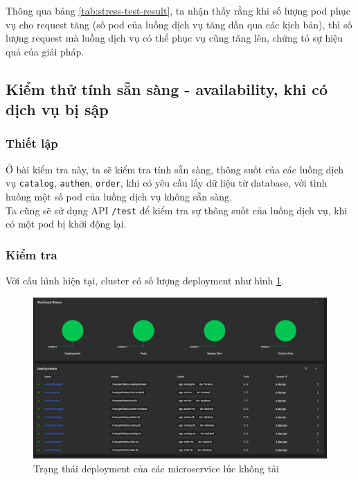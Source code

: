 Thông qua bảng \ref{tab:stress-test-result}, ta nhận thấy rằng khi số lượng pod phục vụ cho request tăng (số pod của luồng dịch vụ tăng dần qua các kịch bản), thì số lượng request mà luồng dịch vụ có thể phục vụ cũng tăng lên, chứng tỏ sự hiệu quả của giải pháp.

\subsection{Kiểm thử tính sẵn sàng - availability, khi có dịch vụ bị sập}
\subsubsection{Thiết lập}
\noindent Ở bài kiểm tra này, ta sẽ kiểm tra tính sẵn sàng, thông suốt của các luồng dịch vụ \lstinline|catalog|, \lstinline|authen|, \lstinline|order|, khi có yêu cầu lấy dữ liệu từ database, với tình huống một số pod của luồng dịch vụ không sẵn sàng.\\[0.5cm]
Ta cũng sẽ sử dụng API \lstinline|/test| để kiểm tra sự thông suốt của luồng dịch vụ, khi có một pod bị khởi động lại.

\subsubsection{Kiểm tra}
\noindent Với cấu hình hiện tại, cluster có số lượng deployment như hình \ref{fig:deployments-final}.

\begin{figure}[H]
  \begin{center}
      \includegraphics[scale = 0.5]{images/hanh/deployments-final}
      \vspace*{1mm}
  \end{center}
  \caption{Trạng thái deployment của các microservice lúc không tải}
  \label{fig:deployments-final}

\end{figure}

